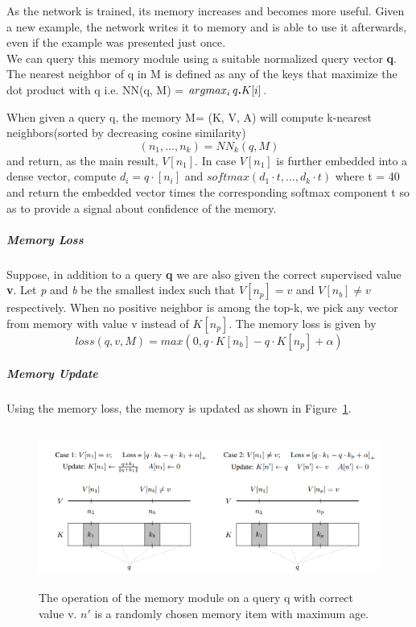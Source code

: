 As the network is trained, its memory increases and becomes more useful. Given a new example, the network writes it to memory and is able to use it afterwards, even if the example was presented just once.\\

We can query this memory module using a suitable normalized query vector \textbf{q}. The nearest neighbor of q in M is defined as any of the keys that maximize the dot product with q i.e. NN(q, M) = \( argmax_i \hspace{0.2em} q \textbf{.} K[i] \).  \newline

When given a query q, the memory M= (K, V, A) will compute k-nearest neighbors(sorted by decreasing cosine similarity)
$$ (n_1, \ldots,  n_k) = NN_{k}(q, M)$$ 
and return,  as the main result, $V[n_1]$. In case $V[n_1]$ is further embedded into a dense vector, compute $d_i = q \cdot [n_i]$ and $softmax(d_1 \cdot t, \ldots, d_k \cdot t) $ where t = 40 and return the embedded vector times the corresponding softmax component t so as to provide a signal about confidence of the memory.


\subparagraph{Memory Loss} Suppose, in addition to a query \textbf{q} we are also given the correct supervised value \textbf{v}. Let \textit{p} and \textit{b} be the smallest index such that \( V [n_p]  = v\) and  \( V [n_b]  \neq v\) respectively. When no positive neighbor is among the top-k, we pick any vector from memory with value v instead of \( K[n_p] \).\newline
The memory loss is given by 
$$ loss(q, v, M) = max(0, q \cdot K[n_{b}] - q \cdot K[n_{p}] + \alpha ) $$

\subparagraph{Memory Update} Using the memory loss, the memory is updated as shown in Figure~\ref{fig:memory}.
\begin{figure}[ht]
\includegraphics[height=5.2cm,width=\textwidth,keepaspectratio]{rare.png}
\caption{\label{fig:memory}The operation of the memory module on a query q with correct value v.
$n\prime$ is a randomly chosen memory item with maximum age.}
\end{figure}

